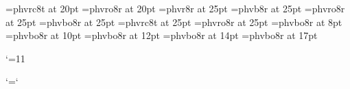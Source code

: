 \font\twtysc=phvrc8t at 20pt
\font\twtysl=phvro8r at 20pt
%
\font\twfvrm=phvr8r at 25pt
\font\twfvbf=phvb8r at 25pt
\font\twfvit=phvro8r at 25pt
\font\twfvbi=phvbo8r at 25pt
\font\twfvsc=phvrc8t at 25pt
\font\twfvsl=phvro8r at 25pt
%
\let\bigfont=\frtrm
\let\Bigfont=\svtrm
\let\BIgfont=\twtyrm
\let\BIGfont=\twfvrm
%
%
\font\ppfftwelve=phvbo8r at 8pt
\font\ppffsixteen=phvbo8r at 10pt
\font\ppfftwenty=phvbo8r at 12pt
\font\ppfftwentyfour=phvbo8r at 14pt
\font\ppfftwentynine=phvbo8r at 17pt
%
\def\tinydyn{\let\ppff\tinyppff}  
\def\smalldyn{let\ppff\smallppff}
\def\normdyn{\let\ppff\normppff}
\def\meddyn{\let\ppff\medppff}
%
\def\f{{\ppff f}}
\def\ff{{\ppff ff}}
\def\fp{{\ppff fp}}
\def\fff{{\ppff fff}}
\def\ffff{{\ppff ffff}}
\def\mf{{\ppff mf}}
\def\p{{\ppff p}}
\def\pp{{\ppff pp}}
\def\ppp{{\ppff ppp}}
\def\pppp{{\ppff pppp}}

\edef\catcodeat{\the\catcode`\@}\catcode`\@=11
%
\def\sF{{\ppff s\p@kern f}}
\def\sfz{{\ppff s\p@kern f\f@kern z}}
\def\sfzp{{\ppff s\p@kern f\f@kern z\p@kern p}}

\def\mp@{{\ppff mp}}
\let\mezzopiano\mp@
\catcode`\@=\catcodeat

\def\smalltype{%
  \let\rm\eightrm
  \let\bf\eightbf
  \let\it\eightit
  \let\bi\eightbi
  \let\sc\eightsc
  \rm}
\def\Smalltype{%
  \let\rm\ninerm
  \let\bf\ninebf
  \let\it\nineit
  \let\bi\ninebi
  \let\sc\ninesc
  \rm}
\def\normtype{%
  \let\rm\tenrm
  \let\bf\tenbf
  \let\it\tenit
  \let\bi\tenbi
  \let\sc\tensc
  \rm}
\def\medtype{%
  \let\rm\twelverm
  \let\bf\twelvebf
  \let\it\twelveit
  \let\bi\twelvebi
  \let\sc\twelvesc
  \rm}
\def\bigtype{%
  \let\rm\bigfont
  \let\bf\bigfont
  \let\it\bigfont
  \let\bi\bigfont
  \let\sc\bigfont
  \sc}
\def\Bigtype{%
  \let\rm\Bigfont
  \let\bf\Bigfont
  \let\it\Bigfont
  \let\bi\Bigfont
  \let\sc\Bigfont
  \sc}
\def\BIgtype{%
  \let\rm\BIgfont
  \let\bf\BIgfont
  \let\it\BIgfont
  \let\bi\Bigfont
  \let\sc\Bigfont
  \sc}
\def\BIGtype{%
  \let\rm\BIGfont
  \let\bf\BIGfont
  \let\it\BIGfont
  \let\bi\BIGfont
  \let\sc\BIGfont
  \sc}
%

\normtype
\endinput

